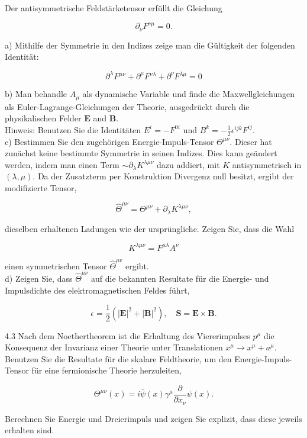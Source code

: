 \documentclass[10pt, letterpaper]{article}
\begin{document}
Der antisymmetrische Feldstärketensor erfüllt die Gleichung

$$
\partial_{\nu} F^{\nu \mu}=0 .
$$

a) Mithilfe der Symmetrie in den Indizes zeige man die Gültigkeit der folgenden Identität:

$$
\partial^{\lambda} F^{\mu \nu}+\partial^{\mu} F^{\nu \lambda}+\partial^{\nu} F^{\lambda \mu}=0
$$

b) Man behandle $A_{\mu}$ als dynamische Variable und finde die Maxwellgleichungen als Euler-Lagrange-Gleichungen der Theorie, ausgedrückt durch die physikalischen Felder $\mathbf{E}$ and $\mathbf{B}$.\\
Hinweis: Benutzen Sie die Identitäten $E^{i}=-F^{0 i}$ und $B^{k}=-\frac{1}{2} \epsilon^{i j k} F^{i j}$.\\
c) Bestimmen Sie den zugehörigen Energie-Impuls-Tensor $\Theta^{\mu \nu}$. Dieser hat zunächst keine bestimmte Symmetrie in seinen Indizes. Dies kann geändert werden, indem man einen Term $\sim \partial_{\lambda} K^{\lambda \mu \nu}$ dazu addiert, mit $K$ antisymmetrisch in $(\lambda, \mu)$. Da der Zusatzterm per Konstruktion Divergenz null besitzt, ergibt der modifizierte Tensor,

$$
\hat{\Theta}^{\mu \nu}=\Theta^{\mu \nu}+\partial_{\lambda} K^{\lambda \mu \nu},
$$

dieselben erhaltenen Ladungen wie der ursprüngliche. Zeigen Sie, dass die Wahl

$$
K^{\lambda \mu \nu}=F^{\mu \lambda} A^{\nu}
$$

einen symmetrischen Tensor $\hat{\Theta}^{\mu v}$ ergibt.\\
d) Zeigen Sie, dass $\hat{\Theta}^{\mu \nu}$ auf die bekannten Resultate für die Energie- und Impulsdichte des elektromagnetischen Feldes führt,

$$
\epsilon=\frac{1}{2}\left(|\mathbf{E}|^{2}+|\mathbf{B}|^{2}\right), \quad \mathbf{S}=\mathbf{E} \times \mathbf{B} .
$$

4.3 Nach dem Noethertheorem ist die Erhaltung des Viererimpulses $p^{\mu}$ die Konsequenz der Invarianz einer Theorie unter Translationen $x^{\mu} \rightarrow x^{\mu}+a^{\mu}$. Benutzen Sie die Resultate für die skalare Feldtheorie, um den Energie-Impuls-Tensor für eine fermionische Theorie herzuleiten,

$$
\Theta^{\mu \nu}(x)=i \bar{\psi}(x) \gamma^{\mu} \frac{\partial}{\partial x_{\nu}} \psi(x) .
$$

Berechnen Sie Energie und Dreierimpuls und zeigen Sie explizit, dass diese jeweils erhalten sind.
\end{document}
